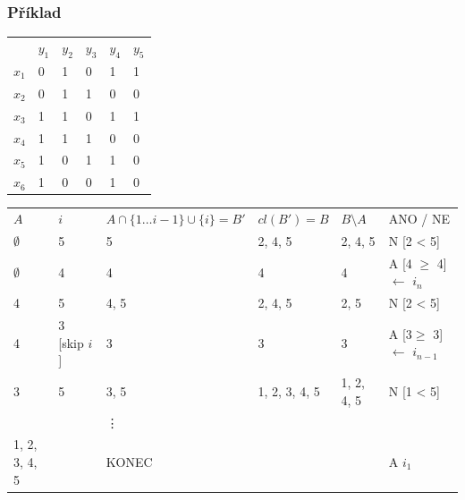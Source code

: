 \subsubsection*{Příklad}
\begin{table}[H]
	\centering
	\begin{tabular}{l|lllll}
		 &  $y_1$& $y_2$ & $y_3$& $y_4$& $y_5$ \\\hhline
		$x_1$ &  0& 1 & 0 &  1& 1 \\
		$x_2$& 0 & 1 & 1 & 0 & 0 \\
		$x_3$& 1 & 1 &  0& 1 & 1 \\
		$x_4$& 1 & 1 & 1 & 0 & 0 \\
		$x_5$& 1 & 0 & 1 & 1 & 0 \\
		$x_6$& 1 & 0 & 0 &  1& 0
	\end{tabular}
\end{table}


\begin{tabular}{l|l|l|l|l|p{3cm}}
\multirow{2}{*}{$ A $} & \multirow{2}{*}{$ i $} & \multirow{2}{*}{$ A \cap \{1 \ldots i - 1\} \cup \{i\} = B' $ } & \multirow{2}{*}{$ cl(B') = B $ } & \multirow{2}{*}{$B \setminus A $  } & \multirow{2}{*}{ANO / NE }  \\
&&&&&\\ \hhline
$\emptyset$ & 5  & 5 &  2, 4, 5&  2, 4, 5&  N [2 < 5] \\
$\emptyset$ & 4  & 4 &  4&  4&  A [4 $\geq$ 4] $\leftarrow$ $i_n$ \\
4 & 5  & 4, 5 &  2, 4, 5&  2, 5&  N [2 < 5] \\
4 & 3 [skip $i$]  & 3 &  3&  3&  A [3$\geq$ 3] $\leftarrow$ $i_{n - 1}$ \\
3 & 5  & 3, 5 &  1, 2, 3, 4, 5&  1, 2, 4, 5&  N [1 < 5] \\
&&\vdots&&& \\
1, 2, 3, 4, 5&&KONEC&&&A $i_{1}$
\end{tabular}